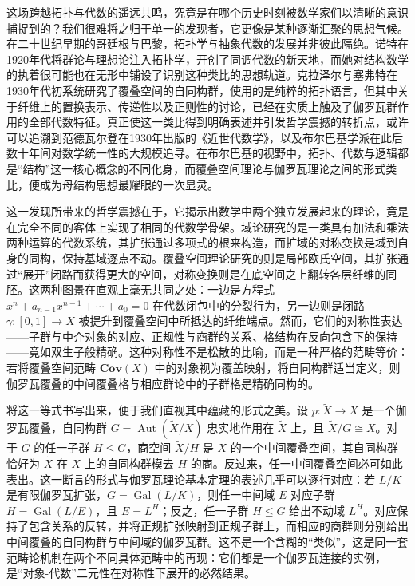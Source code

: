 \documentclass[12pt,a4paper]{article}
\begin{document}
这场跨越拓扑与代数的遥远共鸣，究竟是在哪个历史时刻被数学家们以清晰的意识捕捉到的？我们很难将之归于单一的发现者，它更像是某种逐渐汇聚的思想气候。在二十世纪早期的哥廷根与巴黎，拓扑学与抽象代数的发展并非彼此隔绝。诺特在1920年代将群论与理想论注入拓扑学，开创了同调代数的新天地，而她对结构数学的执着很可能也在无形中铺设了识别这种类比的思想轨道。克拉泽尔与塞弗特在1930年代初系统研究了覆叠空间的自同构群，使用的是纯粹的拓扑语言，但其中关于纤维上的置换表示、传递性以及正则性的讨论，已经在实质上触及了伽罗瓦群作用的全部代数特征。真正使这一类比得到明确表述并引发哲学震撼的转折点，或许可以追溯到范德瓦尔登在1930年出版的《近世代数学》，以及布尔巴基学派在此后数十年间对数学统一性的大规模追寻。在布尔巴基的视野中，拓扑、代数与逻辑都是“结构”这一核心概念的不同化身，而覆叠空间理论与伽罗瓦理论之间的形式类比，便成为母结构思想最耀眼的一次显灵。

这一发现所带来的哲学震撼在于，它揭示出数学中两个独立发展起来的理论，竟是在完全不同的客体上实现了相同的代数学骨架。域论研究的是一类具有加法和乘法两种运算的代数系统，其扩张通过多项式的根来构造，而扩域的对称变换是域到自身的同构，保持基域逐点不动。覆叠空间理论研究的则是局部欧氏空间，其扩张通过“展开”闭路而获得更大的空间，对称变换则是在底空间之上翻转各层纤维的同胚。这两种图景在直观上毫无共同之处：一边是方程式 $x^n + a_{n-1}x^{n-1} + \cdots + a_0 = 0$ 在代数闭包中的分裂行为，另一边则是闭路 $\gamma: [0,1] \to X$ 被提升到覆叠空间中所抵达的纤维端点。然而，它们的对称性表达——子群与中介对象的对应、正规性与商群的关系、格结构在反向包含下的保持——竟如双生子般精确。这种对称性不是松散的比喻，而是一种严格的范畴等价：若将覆叠空间范畴 $\mathbf{Cov}(X)$ 中的对象视为覆盖映射，将自同构群适当定义，则伽罗瓦覆叠的中间覆叠格与相应群论中的子群格是精确同构的。

将这一等式书写出来，便于我们直视其中蕴藏的形式之美。设 $p: \tilde{X} \to X$ 是一个伽罗瓦覆叠，自同构群 $G = \operatorname{Aut}(\tilde{X}/X)$ 忠实地作用在 $\tilde{X}$ 上，且 $\tilde{X}/G \cong X$。对于 $G$ 的任一子群 $H \le G$，商空间 $\tilde{X}/H$ 是 $X$ 的一个中间覆叠空间，其自同构群恰好为 $\tilde{X}$ 在 $X$ 上的自同构群模去 $H$ 的商。反过来，任一中间覆叠空间必可如此表出。这一断言的形式与伽罗瓦理论基本定理的表述几乎可以逐行对应：若 $L/K$ 是有限伽罗瓦扩张，$G = \operatorname{Gal}(L/K)$，则任一中间域 $E$ 对应子群 $H = \operatorname{Gal}(L/E)$，且 $E = L^H$；反之，任一子群 $H \le G$ 给出不动域 $L^H$。对应保持了包含关系的反转，并将正规扩张映射到正规子群上，而相应的商群则分别给出中间覆叠的自同构群与中间域的伽罗瓦群。这不是一个含糊的“类似”，这是同一套范畴论机制在两个不同具体范畴中的再现：它们都是一个伽罗瓦连接的实例，是“对象-代数”二元性在对称性下展开的必然结果。
\end{document}

